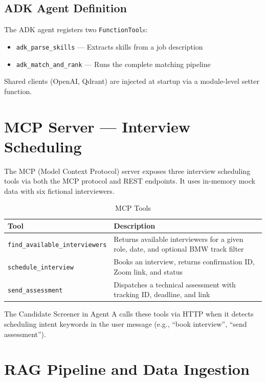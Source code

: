 \documentclass[12pt, a4paper]{article}
\begin{document}
\subsection{ADK Agent Definition}

The ADK agent registers two \texttt{FunctionTool}s:
\begin{itemize}[leftmargin=1.5em]
    \item \texttt{adk\_parse\_skills} — Extracts skills from a job description
    \item \texttt{adk\_match\_and\_rank} — Runs the complete matching pipeline
\end{itemize}

Shared clients (OpenAI, Qdrant) are injected at startup via a module-level setter function.

\section{MCP Server — Interview Scheduling}

The MCP (Model Context Protocol) server exposes three interview scheduling tools via both the MCP protocol and REST endpoints. It uses in-memory mock data with six fictional interviewers.

\begin{table}[H]
\centering
\caption{MCP Tools}
\begin{tabularx}{\textwidth}{l X}
\toprule
\textbf{Tool} & \textbf{Description} \\
\midrule
\texttt{find\_available\_interviewers} & Returns available interviewers for a given role, date, and optional BMW track filter \\
\texttt{schedule\_interview} & Books an interview, returns confirmation ID, Zoom link, and status \\
\texttt{send\_assessment} & Dispatches a technical assessment with tracking ID, deadline, and link \\
\bottomrule
\end{tabularx}
\label{tab:mcp}
\end{table}

The Candidate Screener in Agent A calls these tools via HTTP when it detects scheduling intent keywords in the user message (e.g., ``book interview'', ``send assessment'').

\section{RAG Pipeline and Data Ingestion}
\end{document}
